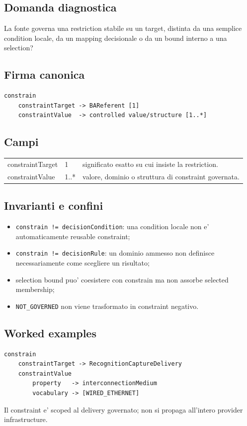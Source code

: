 \documentclass[11pt,a4paper]{article}
\begin{document}
\subsection{Domanda diagnostica}
La fonte governa una restriction stabile su un target, distinta da una semplice condition locale, da un mapping decisionale o da un bound interno a una selection?

\subsection{Firma canonica}
\begin{lstlisting}
constrain
    constraintTarget -> BAReferent [1]
    constraintValue  -> controlled value/structure [1..*]
\end{lstlisting}

\subsection{Campi}
\begin{tabularx}{\textwidth}{L{42mm}L{24mm}Y}
\toprule
constraintTarget & 1 & significato esatto su cui insiste la restriction. \\
constraintValue & 1..* & valore, dominio o struttura di constraint governata. \\
\bottomrule
\end{tabularx}

\subsection{Invarianti e confini}
\begin{itemize}
  \item \texttt{constrain != decisionCondition}: una condition locale non e' automaticamente reusable constraint;
  \item \texttt{constrain != decisionRule}: un dominio ammesso non definisce necessariamente come scegliere un risultato;
  \item selection bound puo' coesistere con constrain ma non assorbe selected membership;
  \item \texttt{NOT\_GOVERNED} non viene trasformato in constraint negativo.
\end{itemize}


\subsection{Worked examples}
\begin{ddtaexample}[title={Facial Access - D-3.6: wired Ethernet sul delivery specifico}]
\begin{lstlisting}
constrain
    constraintTarget -> RecognitionCaptureDelivery
    constraintValue
        property   -> interconnectionMedium
        vocabulary -> [WIRED_ETHERNET]
\end{lstlisting}
Il constraint e' scoped al delivery governato; non si propaga all'intero provider infrastructure.
\end{ddtaexample}
\end{document}
